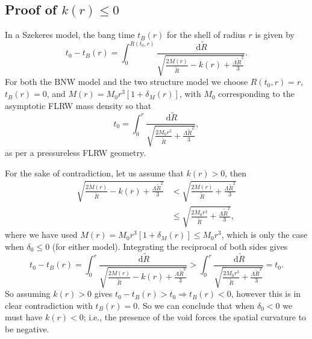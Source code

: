 \documentclass[a4paper,12pt]{report}
\newcommand{\diff}[1]{\,\text{d}{#1}}
\begin{document}
\begin{appendices}

\chapter{Proof of \texorpdfstring{$k(r) \leq 0$}{non-positive curvature function}} \label{appendix: k <= 0 proof}
In a Szekeres model, the bang time $t_B(r)$ for the shell of radius $r$ is given by
\begin{equation}
    t_0 - t_B(r) = \int_0^{R(t_0,r)} \frac{\diff{\tilde{R}}}{\sqrt{\frac{2M(r)}{\tilde{R}} - k(r) + \frac{\Lambda \tilde{R}^2}{3}}}.
\end{equation}
For both the BNW model and the two structure model we choose $R(t_0,r)=r$, $t_B(r) = 0$, and $M(r)=M_0 r^3[1+\delta_M(r)]$, with $M_0$ corresponding to the asymptotic FLRW mass density so that
\begin{equation}
    t_0 = \int_0^r \frac{\diff{\tilde{R}}}{\sqrt{\frac{2M_0 r^3}{\tilde{R}} + \frac{\Lambda \tilde{R}^2}{3}}},
\end{equation}
as per a pressureless FLRW geometry.

For the sake of contradiction, let us assume that $k(r) > 0$, then
\begin{align}
    \sqrt{\frac{2M(r)}{\tilde{R}} - k(r) + \frac{\Lambda \tilde{R}^2}{3}} &<
        \sqrt{\frac{2M(r)}{\tilde{R}} + \frac{\Lambda \tilde{R}^2}{3}} \\
        &\leq \sqrt{\frac{2M_0 r^3}{\tilde{R}} + \frac{\Lambda \tilde{R}^2}{3}},
\end{align}
where we have used $M(r)=M_0 r^3[1+\delta_M(r)] \leq M_0 r^3$, which is only the case when $\delta_0 \leq 0$ (for either model). Integrating the reciprocal of both sides gives
\begin{equation}
    t_0 - t_B(r) = \int_0^r \frac{\diff{\tilde{R}}}{\sqrt{\frac{2M(r)}{\tilde{R}} - k(r) + \frac{\Lambda \tilde{R}^2}{3}}} > \int_0^r \frac{\diff{\tilde{R}}}{\sqrt{\frac{2M_0 r^3}{\tilde{R}} + \frac{\Lambda \tilde{R}^2}{3}}} = t_0.
\end{equation}
So assuming $k(r)>0$ gives $t_0 - t_B(r) > t_0 \Longrightarrow t_B(r) < 0$, however this is in clear contradiction with $t_B(r)=0$. So we can conclude that when $\delta_0 < 0$ we must have $k(r) < 0$; i.e., the presence of the void forces the spatial curvature to be negative.



\end{appendices}
\end{document}

